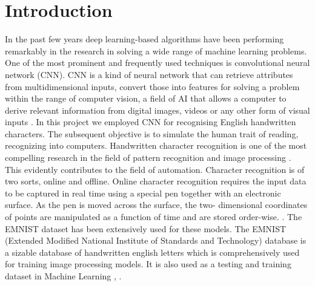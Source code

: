 \documentclass[conference]{IEEEtran}
\begin{document}
\section{Introduction}
In the past few years deep learning-based algorithms have been performing remarkably in the research in solving a wide range of machine learning problems. One of the most prominent and frequently used techniques is convolutional neural network (CNN). CNN is a kind of neural network that can retrieve attributes from multidimensional inputs, convert those into features for solving a problem within the range of computer vision, a field of AI that allows a computer to derive relevant information from digital images, videos or any other form of visual inputs \cite{Baldominos2019}. In this project we employed CNN for recognising English handwritten characters. The subsequent objective is to simulate the human trait of reading, recognizing into computers. Handwritten character recognition is one of the most compelling research in the field of pattern recognition and image processing \cite{Lu2019}. This evidently contributes to the field of automation. Character recognition is of two sorts, online and offline. Online character recognition requires the input data to be captured in real time using a special pen together with an electronic surface. As the pen is moved across the surface, the two- dimensional coordinates of points are manipulated as a function of time and are stored order-wise. \cite{Attigeri2018a}. The EMNIST dataset has been extensively used for these models. The EMNIST (Extended Modified National Institute of Standards and Technology) database is a sizable database of handwritten english letters which is comprehensively used for training image processing models. It is also used as a testing and training dataset in Machine Learning \cite{Baldominos2019}, \cite{Cohen2017}.
\end{document}

